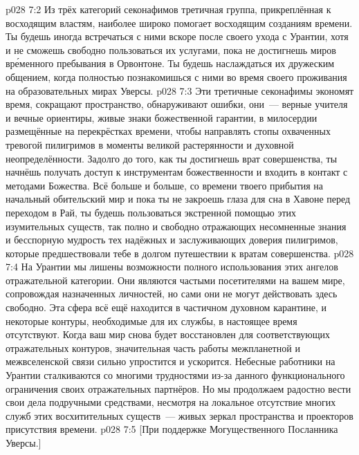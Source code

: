 \vs p028 7:2 \pc Из трёх категорий секонафимов третичная группа, прикреплённая к восходящим властям, наиболее широко помогает восходящим созданиям времени. Ты будешь иногда встречаться с ними вскоре после своего ухода с Урантии, хотя и не сможешь свободно пользоваться их услугами, пока не достигнешь миров вр\'еменного пребывания в Орвонтоне. Ты будешь наслаждаться их дружеским общением, когда полностью познакомишься с ними во время своего проживания на образовательных мирах Уверсы.
\vs p028 7:3 Эти третичные секонафимы экономят время, сокращают пространство, обнаруживают ошибки, они~--- верные учителя и вечные ориентиры, живые знаки божественной гарантии, в милосердии размещённые на перекрёстках времени, чтобы направлять стопы охваченных тревогой пилигримов в моменты великой растерянности и духовной неопределённости. Задолго до того, как ты достигнешь врат совершенства, ты начнёшь получать доступ к инструментам божественности и входить в контакт с методами Божества. Всё больше и больше, со времени твоего прибытия на начальный обительский мир и пока ты не закроешь глаза для сна в Хавоне перед переходом в Рай, ты будешь пользоваться экстренной помощью этих изумительных существ, так полно и свободно отражающих несомненные знания и бесспорную мудрость тех надёжных и заслуживающих доверия пилигримов, которые предшествовали тебе в долгом путешествии к вратам совершенства.
\vs p028 7:4 На Урантии мы лишены возможности полного использования этих ангелов отражательной категории. Они являются частыми посетителями на вашем мире, сопровождая назначенных личностей, но сами они не могут действовать здесь свободно. Эта сфера всё ещё находится в частичном духовном карантине, и некоторые контуры, необходимые для их службы, в настоящее время отсутствуют. Когда ваш мир снова будет восстановлен для соответствующих отражательных контуров, значительная часть работы межпланетной и межвселенской связи сильно упростится и ускорится. Небесные работники на Урантии сталкиваются со многими трудностями из\hyp{}за данного функционального ограничения своих отражательных партнёров. Но мы продолжаем радостно вести свои дела подручными средствами, несмотря на локальное отсутствие многих служб этих восхитительных существ~--- живых зеркал пространства и проекторов присутствия времени.
\vsetoff
\vs p028 7:5 [При поддержке Могущественного Посланника Уверсы.]
\quizlink
